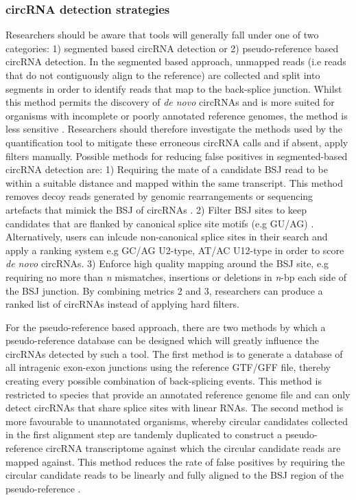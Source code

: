 \subsubsection{circRNA detection strategies}
Researchers should be aware that tools will generally fall under one of two categories: 1) segmented based circRNA detection or 2) pseudo-reference based circRNA detection. In the segmented based approach, unmapped reads (i.e reads that do not contiguously align to the reference) are collected and split into segments in order to identify reads that map to the back-splice junction. Whilst this method permits the discovery of \textit{de novo} circRNAs and is more suited for organisms with incomplete or poorly annotated reference genomes, the method is less sensitive \cite{Jeck2014May}. Researchers should therefore investigate the methods used by the quantification tool to mitigate these erroneous circRNA calls and if absent, apply filters manually. Possible methods for reducing false positives in segmented-based circRNA detection are: 1) Requiring the mate of a candidate BSJ read to be within a suitable distance and mapped within the same transcript. This method removes decoy reads generated by genomic rearrangements or sequencing artefacts that mimick the BSJ of circRNAs \cite{circRNAfinder}. 2) Filter BSJ sites to keep candidates that are flanked by canonical splice site motifs (e.g GU/AG) \cite{findcirc}. Alternatively, users can inlcude non-canonical splice sites in their search and apply a ranking system e.g GC/AG U2-type, AT/AC U12-type \cite{CIRIlong} in order to score \textit{de novo} circRNAs. 3) Enforce high quality mapping around the BSJ site, e.g requiring no more than \textit{n} mismatches, insertions or deletions in \textit{n}-bp each side of the BSJ junction. By combining metrics 2 and 3, researchers can produce a ranked list of circRNAs instead of applying hard filters. \par
For the pseudo-reference based approach, there are two methods by which a pseudo-reference database can be designed which will greatly influence the circRNAs detected by such a tool. The first method is to generate a database of all intragenic exon-exon junctions using the reference GTF/GFF file, thereby creating every possible combination of back-splicing events. This method is restricted to species that provide an annotated reference genome file and can only detect circRNAs that share splice sites with linear RNAs. The second method is more favourable to unannotated organisms, whereby circular candidates collected in the first alignment step are tandemly duplicated to construct a pseudo-reference circRNA transcriptome against which the circular candidate reads are mapped against. This method reduces the rate of false positives by requiring the circular candidate reads to be linearly and fully aligned to the BSJ region of the pseudo-reference \cite{CIRIquant,Sailfishcir,PTESfinder}. \par

